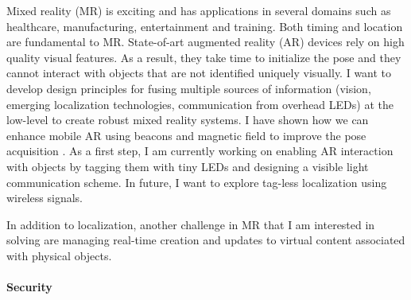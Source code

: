 \documentclass[10pt]{article}
\begin{document}
Mixed reality (MR) is exciting and has applications in several domains such as healthcare, manufacturing, entertainment and training.
Both timing and location are fundamental to MR. State-of-art augmented reality (AR) devices rely on high quality visual features. As a result, they take time to initialize the pose and they cannot interact with objects that 
are not identified uniquely visually.  %
I want to develop design principles for fusing multiple sources of information (vision, emerging localization technologies, communication from overhead LEDs) at the low-level to create robust mixed reality systems. %
I have shown how we can enhance mobile AR using beacons and magnetic field to improve the pose acquisition \cite{mobileAR}. As a first step, I am currently working on enabling AR interaction with objects by tagging them with tiny LEDs and designing a visible light communication scheme. In future, I want to explore tag-less localization using wireless signals. 

In addition to localization, another challenge in MR that I am interested in solving are managing real-time creation and updates to virtual content associated with physical
objects. %



\paragraph{Security}
\end{document}
